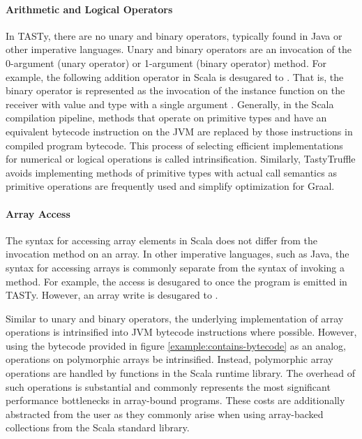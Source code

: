 \paragraph{Arithmetic and Logical Operators}

In TASTy, there are no unary and binary operators, typically found in Java or other imperative languages.
Unary and binary operators are an invocation of the 0-argument (unary operator) or 1-argument (binary operator) method. 
For example, the following addition operator in Scala  is desugared to . 
That is, the binary operator \scalainline{+} is represented as the invocation of the instance function  on the receiver with value  and type  with a single argument .
Generally, in the Scala compilation pipeline, methods that operate on primitive types and have an equivalent bytecode instruction on the JVM\cite{java:vm-spec} are replaced by those instructions in compiled program bytecode. 
This process of selecting efficient implementations for numerical or logical operations is called intrinsification.
Similarly, TastyTruffle avoids implementing methods of primitive types with actual call semantics as primitive operations are frequently used and simplify optimization for Graal.

\paragraph{Array Access}

The syntax for accessing array elements in Scala does not differ from the invocation method on an array.
In other imperative languages, such as Java, the syntax for accessing arrays is commonly separate from the syntax of invoking a method.
For example, the access  is desugared to  once the program is emitted in TASTy.
However, an array write  is desugared to .

Similar to unary and binary operators, the underlying implementation of array operations is intrinsified into JVM bytecode instructions where possible.
However, using the bytecode provided in figure \ref{example:contains-bytecode} as an analog, operations on polymorphic arrays  be intrinsified.
Instead, polymorphic array operations are handled by functions in the Scala runtime library.
The overhead of such operations is substantial and commonly represents the most significant performance bottlenecks in array-bound programs.
These costs are additionally abstracted from the user as they commonly arise when using array-backed collections from the Scala standard library.

